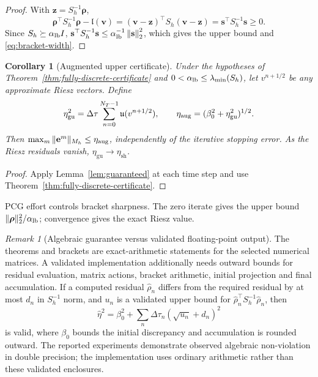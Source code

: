 \documentclass[11pt]{amsart}
\newtheorem{corollary}[theorem]{Corollary}
\theoremstyle{remark}
\newtheorem{remark}[theorem]{Remark}
\newcommand{\Mh}{M_h}
\newcommand{\Sh}{S_h}
\newcommand{\norm}[1]{\left\lVert #1\right\rVert}
\newcommand{\dt}{\Delta\tau}
\newcommand{\etaSharp}{\eta_{\mathrm{sh}}}
\newcommand{\etaGuar}{\eta_{\mathrm{gu}}}
\newcommand{\ee}{\mathbf e}
\newcommand{\rr}{\bm\rho}
\newcommand{\vv}{\mathbf v}
\newcommand{\zz}{\mathbf z}
\newcommand{\sres}{\mathbf s}
\begin{document}
\begin{proof}
With $\zz=\Sh^{-1}\rr$,
\[
 \rr^\top\Sh^{-1}\rr-\mathfrak l(\vv)
 = (\vv-\zz)^\top\Sh(\vv-\zz)
 = \sres^\top\Sh^{-1}\sres\ge0.
\]
Since $\Sh\succeq\alpha_{\rm lb}I$,
$\sres^\top\Sh^{-1}\sres\le
\alpha_{\rm lb}^{-1}\norm{\sres}_2^2$, which gives the upper bound and
\eqref{eq:bracket-width}.
\end{proof}
\begin{corollary}[Augmented upper certificate]
\label{cor:guaranteed}\label{def:guaranteed}
Under the hypotheses of Theorem~\ref{thm:fully-discrete-certificate} and
$0<\alpha_{\rm lb}\le\lambda_{\min}(\Sh)$, let $v^{n+1/2}$ be any
approximate Riesz vectors. Define
\begin{equation}
 \etaGuar^2=\dt\sum_{n=0}^{N_T-1}\mathfrak u(v^{n+1/2}),
 \qquad \eta_{\rm aug}=(\beta_0^2+\etaGuar^2)^{1/2}.
 \label{eq:guaranteed-estimator}
\end{equation}
Then $\max_m\|\ee^m\|_{\Mh}\le\eta_{\rm aug}$, independently of the
iterative stopping error. As the Riesz residuals vanish,
$\etaGuar\to\etaSharp$.
\end{corollary}
\begin{proof}
Apply Lemma~\ref{lem:guaranteed} at each time step and use
Theorem~\ref{thm:fully-discrete-certificate}.
\end{proof}
PCG effort controls bracket sharpness. The zero iterate gives the upper
bound $\|\rr\|_2^2/\alpha_{\rm lb}$; convergence gives the exact Riesz value.

\begin{remark}[Algebraic guarantee versus validated floating-point output]
\label{rem:arithmetic-scope}
The theorems and brackets are exact-arithmetic statements for the
selected numerical matrices. A validated implementation additionally needs
outward bounds for residual evaluation, matrix actions, bracket arithmetic,
initial projection and final accumulation. If a computed residual
$\widehat\rho_n$ differs from the required residual by at most $d_n$ in
$S_h^{-1}$ norm, and $u_n$ is a validated upper bound for
$\widehat\rho_n^\top S_h^{-1}\widehat\rho_n$, then
\[
 \widehat\eta^2=\beta_0^2+\sum_n\Delta\tau_n
                (\sqrt{u_n}+d_n)^2
\]
is valid, where $\beta_0$ bounds the initial discrepancy and accumulation
is rounded outward. The reported experiments demonstrate observed algebraic
non-violation in double precision; the implementation uses ordinary arithmetic rather than these
validated enclosures.
\end{remark}
\end{document}
